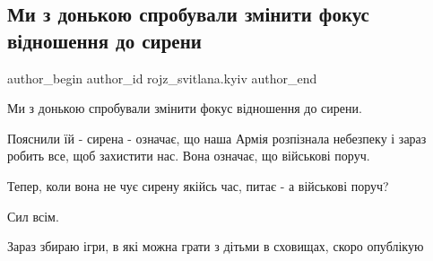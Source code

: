  
 
 
 
 
 
\subsection{Ми з донькою спробували змінити фокус відношення до сирени}
\label{sec:26_02_2022.fb.rojz_svitlana.kyiv.2.sirena}
 
\ifcmt
 author_begin
   author_id rojz_svitlana.kyiv
 author_end
\fi

Ми з донькою спробували змінити фокус відношення до сирени.

Пояснили їй - сирена - означає, що наша Армія розпізнала небезпеку і зараз
робить все, щоб захистити нас. Вона означає, що військові поруч. 

Тепер, коли вона не чує сирену якійсь час, питає - а військові поруч? 

Сил всім. 

Зараз збираю ігри, в які можна грати з дітьми  в сховищах, скоро опублікую
